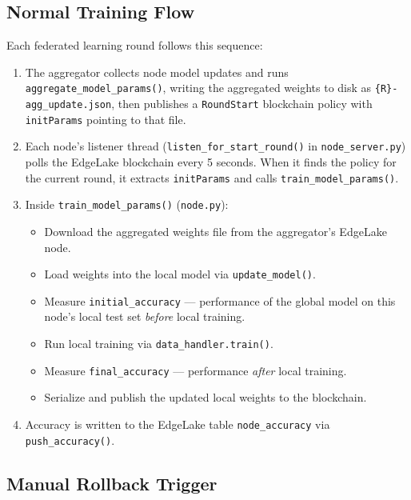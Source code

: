 \documentclass[11pt]{article}
\begin{document}
\subsection{Normal Training Flow}

Each federated learning round follows this sequence:

\begin{enumerate}
    \item The aggregator collects node model updates and runs \texttt{aggregate\_model\_params()}, writing the aggregated weights to disk as \texttt{\{R\}-agg\_update.json}, then publishes a \texttt{RoundStart} blockchain policy with \texttt{initParams} pointing to that file.

    \item Each node's listener thread (\texttt{listen\_for\_start\_round()} in \texttt{node\_server.py}) polls the EdgeLake blockchain every 5 seconds. When it finds the policy for the current round, it extracts \texttt{initParams} and calls \texttt{train\_model\_params()}.

    \item Inside \texttt{train\_model\_params()} (\texttt{node.py}):
    \begin{itemize}
        \item Download the aggregated weights file from the aggregator's EdgeLake node.
        \item Load weights into the local model via \texttt{update\_model()}.
        \item Measure \texttt{initial\_accuracy} — performance of the global model on this node's local test set \textit{before} local training.
        \item Run local training via \texttt{data\_handler.train()}.
        \item Measure \texttt{final\_accuracy} — performance \textit{after} local training.
        \item Serialize and publish the updated local weights to the blockchain.
    \end{itemize}

    \item Accuracy is written to the EdgeLake table \texttt{node\_accuracy} via \texttt{push\_accuracy()}.
\end{enumerate}

\subsection{Manual Rollback Trigger}
\end{document}
